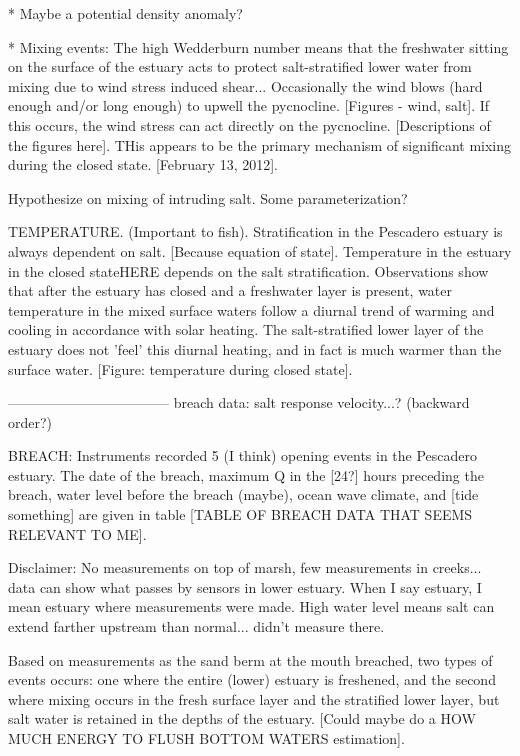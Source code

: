 * Maybe a potential density anomaly?


* Mixing events: The high Wedderburn number means that the freshwater
sitting on the surface of the estuary acts to protect salt-stratified
lower water from mixing due to wind stress induced shear... Occasionally
the wind blows (hard enough and/or long enough) to upwell the
pycnocline. [Figures - wind, salt]. If this occurs, the wind stress can
act directly on the pycnocline. [Descriptions of the figures here]. 
THis appears to be the primary mechanism of significant mixing during
the closed state.  [February 13, 2012].



Hypothesize on mixing of intruding salt. Some parameterization?

TEMPERATURE. (Important to fish). Stratification in the Pescadero
estuary is always dependent on salt. [Because equation of state].
Temperature in the estuary in the closed state{HERE} depends on the salt
stratification. Observations show that after the estuary has closed and
a freshwater layer is present, water temperature in the mixed surface
waters follow a diurnal trend of warming and cooling in accordance with
solar heating. The salt-stratified lower layer of the estuary does not
'feel' this diurnal heating, and in fact is much warmer than the surface
water. [Figure: temperature during closed state].

----------------------------------- breach data: salt response
velocity...? (backward order?)


BREACH: Instruments recorded 5 (I think) opening events in the Pescadero
estuary. The date of the breach, maximum Q in the [24?] hours preceding
the breach, water level before the breach (maybe), ocean wave climate,
and [tide something] are given in table [TABLE OF BREACH DATA THAT SEEMS
RELEVANT TO ME].

{Disclaimer: No measurements on top of marsh, few measurements in
creeks... data can show what passes by sensors in lower estuary. When I
say estuary, I mean estuary where measurements were made. High water
level means salt can extend farther upstream than normal... didn't
measure there}.

Based on measurements as the sand berm at the mouth breached, two types
of events occurs: one where the entire (lower) estuary is freshened, and
the second where mixing occurs in the fresh surface layer and the
stratified lower layer, but salt water is retained in the depths of the
estuary. [Could maybe do a HOW MUCH ENERGY TO FLUSH BOTTOM WATERS
estimation].

